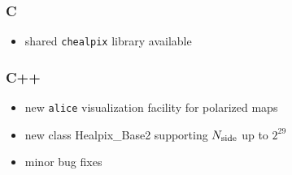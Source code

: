\documentclass[12pt,twoside]{article}
\newcommand{\nside}{{N_{\rm side}}}
\begin{document}
{{\subsubsection[New Features: C]{C}
  \begin{itemize}
    \item shared {\tt chealpix} library available
  \end{itemize}
\subsubsection[New Features: C++]{C++}
  \begin{itemize}
    \item new {\tt alice} visualization facility for polarized maps
    \item new class Healpix\_Base2 supporting $\nside$ up to $2^{29}$
    \item minor bug fixes
  \end{itemize}
}}
\end{document}

